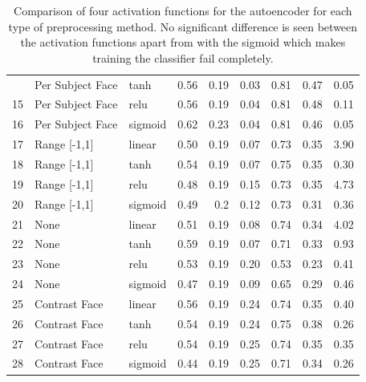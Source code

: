 \begin{table}[!h]
{\begin{tabular}{lllrrrrrr}
             \hdashline
             14&Per Subject Face  & tanh   &    0.56 &   0.19 &     0.03 &    0.81 &   0.47 &     0.05 \\
             15&Per Subject Face  & relu   &    0.56 &   0.19 &     0.04 &    0.81 &   0.48 &     0.11 \\
             16& Per Subject Face      & sigmoid &    0.62 &   0.23 &     0.04 &    0.81 &   0.46 &     0.05 \\
             \hline
             17&Range [-1,1]      & linear &    0.50 &   0.19 &     0.07 &    0.73 &   0.35 &     3.90 \\
             18&Range [-1,1]      & tanh   &    0.54 &   0.19 &     0.07 &    0.75 &   0.35 &     0.30 \\
             19&Range [-1,1]      & relu   &    0.48 &   0.19 &     0.15 &    0.73 &   0.35 &     4.73 \\
             20& Range [-1,1]      & sigmoid &    0.49 &   0.2  &     0.12 &    0.73 &   0.31 &     0.36 \\
             \hline
             21&None              & linear &    0.51 &   0.19 &     0.08 &    0.74 &   0.34 &     4.02 \\
             22&None              & tanh   &    0.59 &   0.19 &     0.07 &    0.71 &   0.33 &     0.93 \\
             23&None              & relu   &    0.53 &   0.19 &     0.20 &    0.53 &   0.23 &     0.41 \\
             24& None       & sigmoid &    0.47 &   0.19 &     0.09 &    0.65 &   0.29 &     0.46 \\
             \hline
             25&Contrast Face     & linear &    0.56 &   0.19 &     0.24 &    0.74 &   0.35 &     0.40 \\
             26&Contrast Face     & tanh   &    0.54 &   0.19 &     0.24 &    0.75 &   0.38 &     0.26 \\
             27&Contrast Face     & relu   &    0.54 &   0.19 &     0.25 &    0.74 &   0.35 &     0.35 \\
             28& Contrast Face    & sigmoid &    0.44 &   0.19 &     0.25 &    0.71 &   0.34 &     0.26 \\
             \hline
            \end{tabular}
              \caption{Comparison of four activation functions for the autoencoder for each type of preprocessing method.
              No significant difference is seen between the activation functions apart from with the sigmoid
              which makes training the classifier fail completely.
}}
\end{table}
